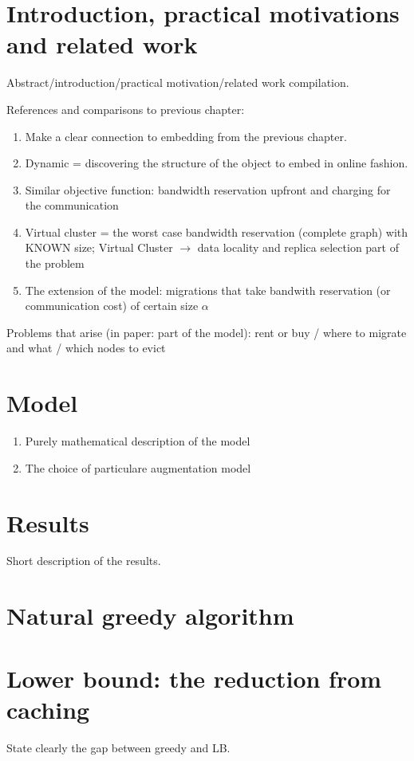 \documentclass[a4paper]{book}
\begin{document}
\section{Introduction, practical motivations and related work}

Abstract/introduction/practical motivation/related work compilation.

References and comparisons to previous chapter:
\begin{enumerate}
  \item Make a clear connection to embedding from the previous chapter.
  \item Dynamic = discovering the structure of the object to embed in online fashion.
  \item Similar objective function: bandwidth reservation upfront and charging for the communication
  \item Virtual cluster = the worst case bandwidth reservation (complete graph) with KNOWN size; Virtual Cluster $\rightarrow$ data locality and replica selection part of the problem
  \item The extension of the model: migrations that take bandwith reservation (or communication cost) of certain size $\alpha$
\end{enumerate}

Problems that arise (in paper: part of the model): rent or buy / where to migrate and what / which nodes to evict

\section{Model}
\begin{enumerate}
  \item Purely mathematical description of the model
  \item The choice of particulare augmentation model
\end{enumerate}
\section{Results}
Short description of the results.
\section{Natural greedy algorithm}
\section{Lower bound: the reduction from caching}
State clearly the gap between greedy and LB. 
\end{document}
